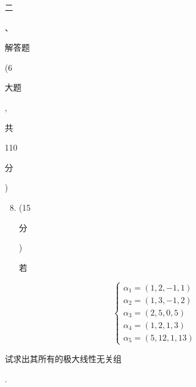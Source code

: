 \documentclass[10pt]{article}
\begin{document}
\begin{CJK}{UTF8}{mj}二\end{CJK}、 \begin{CJK}{UTF8}{mj}解答题\end{CJK} (6 \begin{CJK}{UTF8}{mj}大题\end{CJK}, \begin{CJK}{UTF8}{mj}共\end{CJK} 110 \begin{CJK}{UTF8}{mj}分\end{CJK})

\begin{enumerate}
  \setcounter{enumi}{7}
  \item (15 \begin{CJK}{UTF8}{mj}分\end{CJK}) \begin{CJK}{UTF8}{mj}若\end{CJK}
\end{enumerate}
$$
\left\{\begin{array}{l}
\alpha_{1}=(1,2,-1,1) \\
\alpha_{2}=(1,3,-1,2) \\
\alpha_{3}=(2,5,0,5) \\
\alpha_{4}=(1,2,1,3) \\
\alpha_{5}=(5,12,1,13)
\end{array}\right.
$$
\begin{CJK}{UTF8}{mj}试求出其所有的极大线性无关组\end{CJK}.
\end{document}
